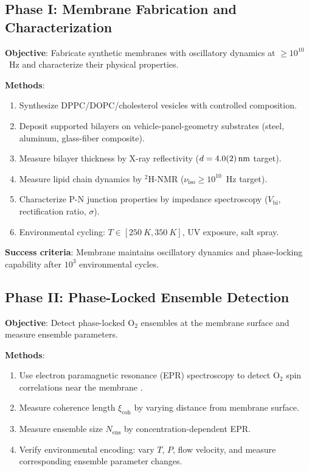\documentclass[12pt]{article}
\theoremstyle{definition}
\theoremstyle{remark}
\newcommand{\xicoh}{\xi_{\mathrm{coh}}}
\newcommand{\Nens}{N_{\mathrm{ens}}}
\begin{document}
\subsection{Phase I: Membrane Fabrication and Characterization}

\textbf{Objective}: Fabricate synthetic membranes with oscillatory dynamics at $\geq 10^{10}$~Hz and characterize their physical properties.

\textbf{Methods}:
\begin{enumerate}[label=\arabic*.]
  \item Synthesize DPPC/DOPC/cholesterol vesicles with controlled composition.
  \item Deposit supported bilayers on vehicle-panel-geometry substrates (steel, aluminum, glass-fiber composite).
  \item Measure bilayer thickness by X-ray reflectivity ($d = \SI{4.0 \pm 0.2}{nm}$ target).
  \item Measure lipid chain dynamics by $^2$H-NMR ($\nu_{\mathrm{iso}} \geq 10^{10}$~Hz target).
  \item Characterize P-N junction properties by impedance spectroscopy ($V_{\mathrm{bi}}$, rectification ratio, $\sigma$).
  \item Environmental cycling: $T \in [\SI{250}{K}, \SI{350}{K}]$, UV exposure, salt spray.
\end{enumerate}

\textbf{Success criteria}: Membrane maintains oscillatory dynamics and phase-locking capability after $10^3$ environmental cycles.

\subsection{Phase II: Phase-Locked Ensemble Detection}

\textbf{Objective}: Detect phase-locked $\mathrm{O}_2$ ensembles at the membrane surface and measure ensemble parameters.

\textbf{Methods}:
\begin{enumerate}[label=\arabic*.]
  \item Use electron paramagnetic resonance (EPR) spectroscopy to detect $\mathrm{O}_2$ spin correlations near the membrane \cite{herzberg1945molecular}.
  \item Measure coherence length $\xicoh$ by varying distance from membrane surface.
  \item Measure ensemble size $\Nens$ by concentration-dependent EPR.
  \item Verify environmental encoding: vary $T$, $P$, flow velocity, and measure corresponding ensemble parameter changes.
\end{enumerate}
\end{document}
